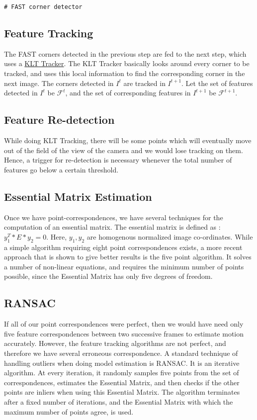 \documentclass[a4paper,12pt]{extarticle}
\theoremstyle{mytheor}
\begin{document}
\begin{lstlisting}
# FAST corner detector 

\end{lstlisting}

\subsection{Feature Tracking}

The FAST corners detected in the previous step are fed to the next step, which uses a \href{https://cecas.clemson.edu/~stb/klt/}{KLT Tracker}. The KLT Tracker basically looks around every corner to be tracked, and uses this local information to find the corresponding corner in the next image. The corners detected in $I^{t}$ are tracked in $I^{t+1}$. Let the set of features detected in $I^{t}$ be $\mathcal{F}^{t}$, and the set of corresponding features in $I^{t+1}$ be $\mathcal{F}^{t+1}$.

\subsection{Feature Re-detection}

While doing KLT Tracking, there will be some points which will eventually move out of the field of the view of the camera and we would lose tracking on them. Hence, a trigger for re-detection is necessary whenever the total number of features go below a certain threshold.

\subsection{Essential Matrix Estimation}
Once we have point-correspondences, we have several techniques for the computation of an essential matrix. The essential matrix is defined as : $ y_{1}^{T} * E * y_{2} = 0 $. Here, $y_{1}, y_{2}$ are homogenous normalized image co-ordinates. While a simple algorithm requiring eight point correspondences exists, a more recent approach that is shown to give better results is the five point algorithm. It solves a number of non-linear equations, and requires the minimum number of points possible, since the Essential Matrix has only five degrees of freedom.

\subsection{RANSAC}
If all of our point correspondences were perfect, then we would have need only five feature correspondences between two successive frames to estimate motion accurately. However, the feature tracking algorithms are not perfect, and therefore we have several erroneous correspondence. A standard technique of handling outliers when doing model estimation is RANSAC. It is an iterative algorithm. At every iteration, it randomly samples five points from the set of correspondences, estimates the Essential Matrix, and then checks if the other points are inliers when using this Essential Matrix. The algorithm terminates after a fixed number of iterations, and the Essential Matrix with which the maximum number of points agree, is used. 
\end{document}
